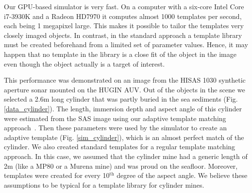 % 
% 




% 
% 

Our GPU-based simulator is very fast. On a computer with a six-core Intel Core i7-3930K and a Radeon HD7970 it computes almost 1000 templates per second, each being 1 megapixel large. This makes it possible to tailor the templates very closely imaged objects. In contrast, in the standard approach a template library must be created beforehand from a limited set of parameter values. Hence, it may happen that no template in the library is a close fit of the object in the image even though the object actually is a target of interest.

This performance was demonstrated on an image from the HISAS 1030 synthetic aperture sonar mounted on the HUGIN AUV. Out of the objects in the scene we selected a 2.6\;m long cylinder that was partly buried in the sea sediments (Fig. \ref{data_cylinder}). The length, immersion depth and aspect angle of this cylinder were estimated from the SAS image using our  adaptive template matching approach~\cite{Midelfart2010}.  Then these parameters were used by the simulator to create an adaptive template (Fig. \ref{sim_cylinder}), which is an almost perfect match of the cylinder. We also created standard templates for a regular template matching approach. In this case, we assumed that the cylinder mine had a generic length of 2\;m (like a MP80 or a Murena mine) and was proud on the seafloor. Moreover, templates were created for every 10$^\text{th}$ degree of the aspect angle. We believe these assumptions to be typical for a template library for cylinder mines. 

